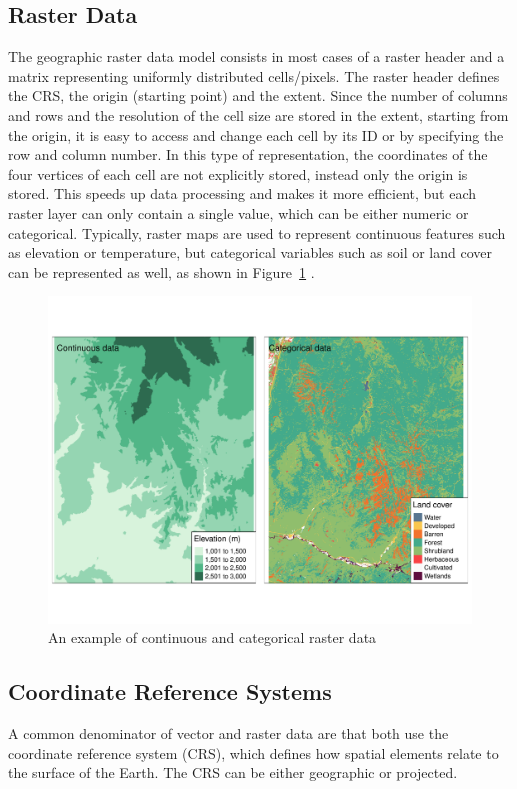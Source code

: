 \subsection{Raster Data}
The geographic raster data model consists in most cases of a raster header and a matrix representing uniformly distributed cells/pixels. The raster header defines the CRS, the origin (starting point) and the extent. Since the number of columns and rows and the resolution of the cell size are stored in the extent, starting from the origin, it is easy to access and change each cell by its ID or by specifying the row and column number. In this type of representation, the coordinates of the four vertices of each cell are not explicitly stored, instead only the origin is stored. This speeds up data processing and makes it more efficient, but each raster layer can only contain a single value, which can be either numeric or categorical. Typically, raster maps are used to represent continuous features such as elevation or temperature, but categorical variables such as soil or land cover can be represented as well, as shown in Figure~\ref{fig:raster} \autocite[][]{lovelace2019geocomputation}.
\begin{figure}[H]
   \centering
       \includegraphics[page=1,width=\textwidth]{raster.pdf}
 \caption{An example of continuous and categorical raster data}
 \label{fig:raster}
\end{figure}
\clearpage
\subsection{Coordinate Reference Systems}
A common denominator of vector and raster data are that both use the coordinate reference system (CRS), which defines how spatial elements relate to the surface of the Earth. The CRS can be either geographic or projected.
